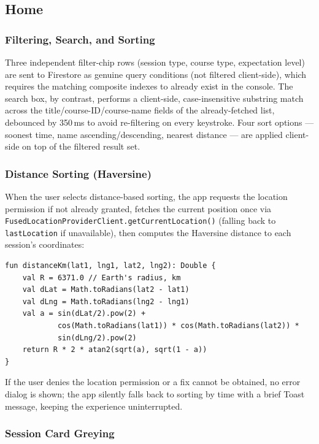 \subsection{Home}

\subsubsection{Filtering, Search, and Sorting}

Three independent filter-chip rows (session type, course type, expectation level) are sent to Firestore as genuine query conditions (not filtered client-side), which requires the matching composite indexes to already exist in the console. The search box, by contrast, performs a client-side, case-insensitive substring match across the title/course-ID/course-name fields of the already-fetched list, debounced by 350\,ms to avoid re-filtering on every keystroke. Four sort options — soonest time, name ascending/descending, nearest distance — are applied client-side on top of the filtered result set.

\subsubsection{Distance Sorting (Haversine)}

When the user selects distance-based sorting, the app requests the location permission if not already granted, fetches the current position once via \texttt{FusedLocationProviderClient.getCurrentLocation()} (falling back to \texttt{lastLocation} if unavailable), then computes the Haversine distance to each session's coordinates:

\begin{verbatim}
fun distanceKm(lat1, lng1, lat2, lng2): Double {
    val R = 6371.0 // Earth's radius, km
    val dLat = Math.toRadians(lat2 - lat1)
    val dLng = Math.toRadians(lng2 - lng1)
    val a = sin(dLat/2).pow(2) +
            cos(Math.toRadians(lat1)) * cos(Math.toRadians(lat2)) *
            sin(dLng/2).pow(2)
    return R * 2 * atan2(sqrt(a), sqrt(1 - a))
}
\end{verbatim}

If the user denies the location permission or a fix cannot be obtained, no error dialog is shown; the app silently falls back to sorting by time with a brief Toast message, keeping the experience uninterrupted.

\subsubsection{Session Card Greying}

